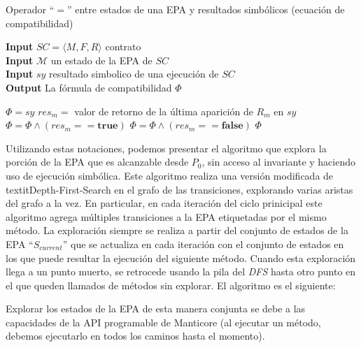 \begin{algorithm}[H]
    \captionsetup{belowskip=0pt}
    \caption{Operador ``$=$'' entre estados de una EPA y resultados simbólicos (ecuación de compatibilidad)}
    \hspace*{\algorithmicindent} \textbf{Input} $SC = \langle M, F, R \rangle$ contrato \\
    \hspace*{\algorithmicindent} \textbf{Input} $\mathcal{M}$ un estado de la EPA de $SC$ \\
    \hspace*{\algorithmicindent} \textbf{Input} $sy$ resultado simbolico de una ejecución de $SC$ \\
    \hspace*{\algorithmicindent} \textbf{Output} La fórmula de compatibilidad $\Phi$
    \begin{algorithmic}[1]
        \State $\Phi = sy$
        \State $res_m =$ valor de retorno de la última aparición de $R_m$ en $sy$
        \State $\Phi = \Phi \land (res_m == \textbf{true})$
        \Else
        \State $\Phi = \Phi \land (res_m == \textbf{false})$
        \EndIf
        \EndFor
        \State \Return $\Phi$
    \end{algorithmic}
\end{algorithm}

Utilizando estas notaciones, podemos presentar el algoritmo que explora la porción de la EPA que es alcanzable desde $P_0$, sin acceso al invariante y haciendo uso de ejecución simbólica.
Este algoritmo realiza una versión	modificada de textit{Depth-First-Search} en el grafo de las transiciones, explorando varias aristas del grafo a la vez.
En particular, en cada iteración del ciclo prinicipal este algoritmo agrega múltiples transiciones a la EPA etiquetadas por el mismo método.
La exploración siempre se realiza a partir del conjunto de estados de la EPA ``$S_{current}$'' que se actualiza en cada iteración con el conjunto de estados en los que puede resultar la ejecución del siguiente método.
Cuando esta exploración llega a un punto muerto, se retrocede usando la pila del \textit{DFS} hasta otro punto en el que queden llamados de métodos sin explorar.
El algoritmo es el siguiente:


%    
Explorar los estados de la EPA de esta manera conjunta se debe a las capacidades de la API programable de Manticore (al ejecutar un método, debemos ejecutarlo en todos los caminos hasta el momento).

